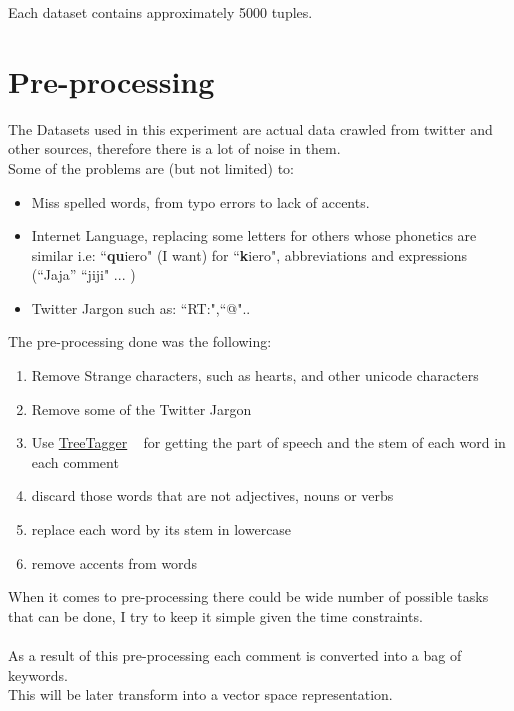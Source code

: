 \documentclass[4pt,a4paper,twocolumn]{article}
\begin{document}
Each dataset contains approximately 5000 tuples.

\section{Pre-processing}

The Datasets used in this experiment are actual data crawled from twitter and other sources, therefore there is a lot of noise in them.\\
Some of the problems are (but not limited) to:\\
\begin{itemize}
	\item Miss spelled words, from typo errors to lack of accents.
	\item Internet Language, replacing some letters for others whose phonetics are similar i.e: ``\textbf{qu}iero" (I want) for ``\textbf{k}iero", abbreviations and expressions (``Jaja'' ``jiji" ... )
	\item Twitter Jargon such as: ``RT:",``@"..
\end{itemize} 

The pre-processing done was the following:
\begin{enumerate}
	\item Remove Strange characters, such as hearts, and other unicode characters
	\item Remove some of the Twitter Jargon 
	\item Use \href{http://www.ims.uni-stuttgart.de/projekte/corplex/TreeTagger/}{TreeTagger} ~\cite{Schmid94probabilisticpart-of-speech} for getting the part of speech and the stem of each word in each comment
	\item discard those words that are not adjectives, nouns or verbs
	\item replace each word by its stem in lowercase
	\item remove accents from words
\end{enumerate}

When it comes to pre-processing there could be wide number of possible 
tasks that can be done, I try to keep it simple given the time constraints. \\
\\
As a result of this pre-processing each comment is converted into a bag of keywords.\\
This will be later transform into a vector space representation.


\end{document}
